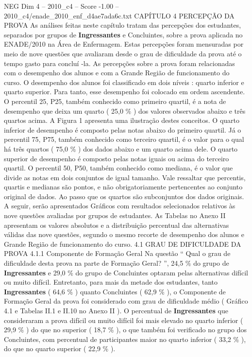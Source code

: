 \begin{textsample}{NEG Dim 4 – 2010\_c4 – Score -1.00 – 2010\_c4/enade\_2010\_enf\_d4ae7ada6c.txt}  \label{ex:f4_neg_065}
CAPÍTULO 4 PERCEPÇÃO DA PROVA As análises feitas neste capítulo tratam das percepções dos estudantes, separados por grupos de \textbf{Ingressantes} e Concluintes, sobre a prova aplicada no ENADE/2010 na Área de Enfermagem.
Estas percepções foram mensuradas por meio de nove questões que avaliaram desde o grau de dificuldade da prova até o tempo gasto para concluí -la.
As percepções sobre a prova foram relacionadas com o desempenho dos alunos e com a Grande Região de funcionamento do curso.
O desempenho dos alunos foi classificado em dois níveis : quarto inferior e quarto superior.
Para tanto, esse desempenho foi colocado em ordem ascendente.
O percentil 25, P25, também conhecido como primeiro quartil, é a nota de desempenho que deixa um quarto ( 25,0 \% ) dos valores observados abaixo e três quartos acima.
A Figura 1 apresenta uma ilustração destes conceitos.
O quarto inferior de desempenho é composto pelas notas abaixo do primeiro quartil.
Já o percentil 75, P75, também conhecido como terceiro quartil, é o valor para o qual há três quartos ( 75,0 \% ) dos dados abaixo e um quarto acima dele.
O quarto superior de desempenho é composto pelas notas iguais ou acima do terceiro quartil.
O percentil 50, P50, também conhecido como mediana, é o valor que divide as notas em dois conjuntos de igual tamanho.
Vale ressaltar que percentis, quartis e medianas são pontos, e não obrigatoriamente pertencentes ao conjunto original de dados.
Ao passo que os quartos são subconjuntos dos dados originais.
A seguir, serão apresentados Gráficos com resultados selecionados relativos às nove questões avaliadas por grupos de estudantes.
As Tabelas no Anexo II apresentam os valores absolutos e a distribuição percentual das alternativas válidas das nove questões, segundo o mesmo recorte de desempenho dos alunos e Grande Região de funcionamento do curso. 4.1 GRAU DE DIFICULDADE DA PROVA 4.1.1 Componente de Formação Geral Na questão “ Qual o grau de dificuldade desta prova na parte de Formação Geral? ”, 24,5 \% do grupo de \textbf{Ingressantes} e 29,0 \% do grupo de Concluintes optaram pelas alternativas difícil ou muito difícil.
Entretanto, para mais da metade dos estudantes, tanto \textbf{Ingressantes} ( 64,6 \% ) quanto Concluintes ( 62,9 \% ), o Componente de Formação Geral da prova foi considerado com grau de dificuldade médio ( Gráfico 4.1 e Tabelas II.1 e II.10 no Anexo II ).
O percentual de \textbf{Ingressantes} que consideraram a prova difícil ou muito difícil foi mais elevado no quarto inferior ( 29,9 \% ) do que no superior ( 18,7 \% ), o que também foi verificado no grupo dos Concluintes, com percentual de participantes maior no quarto inferior ( 33,2 \% ), do que no quarto superior ( 22,9 \% ).

\end{textsample}
